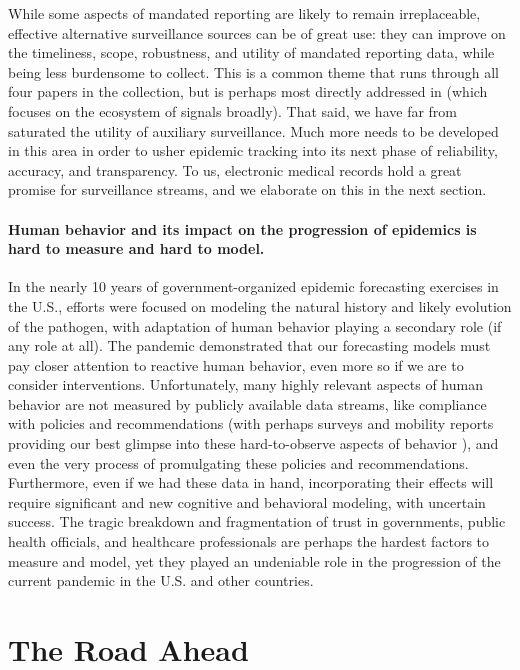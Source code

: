 \documentclass{article}
\begin{document}
While some aspects of mandated reporting are likely to remain irreplaceable,
effective alternative surveillance sources can be of great use: they can improve
on the timeliness, scope, robustness, and utility of mandated reporting data,
while being less burdensome to collect.  This is a common theme that runs
through all four papers in the collection, but is perhaps most directly
addressed in \citet{Reinhart:2021} (which focuses on the ecosystem of signals
broadly).  That said, we have far from saturated the utility of auxiliary
surveillance.  Much more needs to be developed in this area in order to usher
epidemic tracking into its next phase of reliability, accuracy, and
transparency.  To us, electronic medical records hold a great promise for
surveillance streams, and we elaborate on this in the next section.

\paragraph{Human behavior and its impact on the progression of epidemics is hard
  to measure and hard to model.}

In the nearly 10 years of government-organized epidemic forecasting exercises in
the U.S., efforts were focused on modeling the natural history and likely
evolution of the pathogen, with adaptation of human behavior playing a secondary
role (if any role at all).  The pandemic demonstrated that our forecasting
models must pay closer attention to reactive human behavior, even more so if we
are to consider interventions.  Unfortunately, many highly relevant aspects of
human behavior are not measured by publicly available data streams, like
compliance with policies and recommendations (with perhaps surveys and mobility
reports providing our best glimpse into these hard-to-observe aspects of
behavior \citep{Bilinski:2021}), and even the very process of promulgating these 
policies and recommendations.  Furthermore, even if we had these data in hand,
incorporating their effects will require significant and new cognitive and
behavioral modeling, with uncertain success.  The tragic breakdown and
fragmentation of trust in governments, public health officials, and healthcare
professionals are perhaps the hardest factors to measure and model, yet they
played an undeniable role in the progression of the current pandemic in the
U.S. and other countries. 

\section{The Road Ahead}
\end{document}
